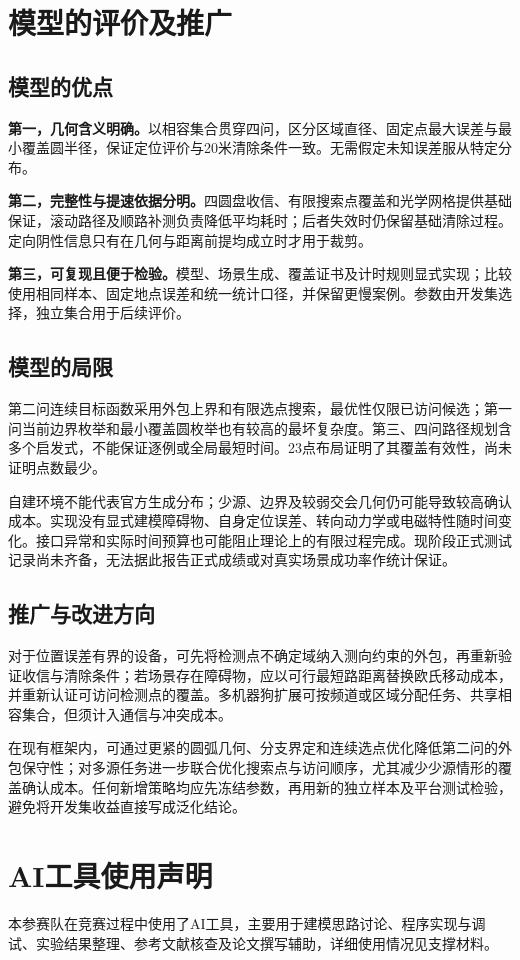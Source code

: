 \documentclass{JXUSTmodeling}
\begin{document}
\section{模型的评价及推广}\label{sec:7}
\subsection{模型的优点}
\textbf{第一，几何含义明确。}以相容集合贯穿四问，区分区域直径、固定点最大误差与最小覆盖圆半径，保证定位评价与20米清除条件一致。无需假定未知误差服从特定分布。

\textbf{第二，完整性与提速依据分明。}四圆盘收信、有限搜索点覆盖和光学网格提供基础保证，滚动路径及顺路补测负责降低平均耗时；后者失效时仍保留基础清除过程。定向阴性信息只有在几何与距离前提均成立时才用于裁剪。

\textbf{第三，可复现且便于检验。}模型、场景生成、覆盖证书及计时规则显式实现；比较使用相同样本、固定地点误差和统一统计口径，并保留更慢案例。参数由开发集选择，独立集合用于后续评价。

\subsection{模型的局限}
第二问连续目标函数采用外包上界和有限选点搜索，最优性仅限已访问候选；第一问当前边界枚举和最小覆盖圆枚举也有较高的最坏复杂度。第三、四问路径规划含多个启发式，不能保证逐例或全局最短时间。23点布局证明了其覆盖有效性，尚未证明点数最少。

自建环境不能代表官方生成分布；少源、边界及较弱交会几何仍可能导致较高确认成本。实现没有显式建模障碍物、自身定位误差、转向动力学或电磁特性随时间变化。接口异常和实际时间预算也可能阻止理论上的有限过程完成。现阶段正式测试记录尚未齐备，无法据此报告正式成绩或对真实场景成功率作统计保证。

\subsection{推广与改进方向}
对于位置误差有界的设备，可先将检测点不确定域纳入测向约束的外包，再重新验证收信与清除条件；若场景存在障碍物，应以可行最短路距离替换欧氏移动成本，并重新认证可访问检测点的覆盖。多机器狗扩展可按频道或区域分配任务、共享相容集合，但须计入通信与冲突成本。

在现有框架内，可通过更紧的圆弧几何、分支界定和连续选点优化降低第二问的外包保守性；对多源任务进一步联合优化搜索点与访问顺序，尤其减少少源情形的覆盖确认成本。任何新增策略均应先冻结参数，再用新的独立样本及平台测试检验，避免将开发集收益直接写成泛化结论。

\section*{AI工具使用声明}
本参赛队在竞赛过程中使用了AI工具，主要用于建模思路讨论、程序实现与调试、实验结果整理、参考文献核查及论文撰写辅助，详细使用情况见支撑材料。
\end{document}
